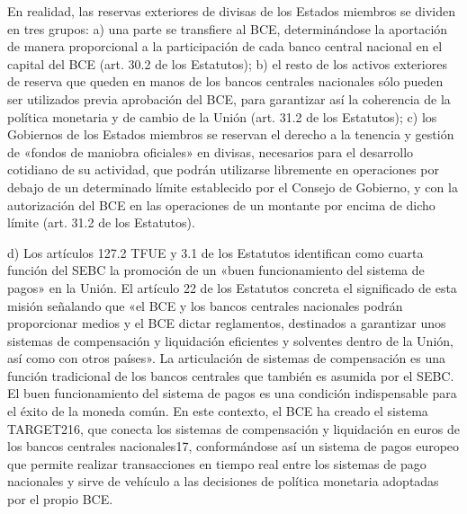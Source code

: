 \documentclass[10pt,a4paper]{article}
\begin{document}
En realidad, las reservas exteriores de divisas de los Estados miembros se dividen en tres grupos: a) una parte se transfiere al BCE, determinándose la aportación de manera proporcional a la participación de cada banco central nacional en el capital del BCE  (art. 30.2 de los Estatutos); b) el resto de los activos exteriores de reserva que queden en manos de los bancos centrales nacionales sólo pueden ser utilizados previa aprobación del BCE, para garantizar así la coherencia de la política monetaria y de cambio de la Unión (art. 31.2 de los Estatutos); c) los Gobiernos de los Estados miembros se reservan el derecho a la tenencia y gestión de «fondos de maniobra oficiales» en divisas, necesarios para el desarrollo cotidiano de su actividad, que podrán utilizarse libremente en operaciones por debajo de un determinado límite establecido por el Consejo de Gobierno, y con la autorización del BCE en las operaciones de un montante por encima de dicho límite (art. 31.2 de los Estatutos).

d) Los artículos 127.2 TFUE y 3.1 de los Estatutos identifican como cuarta función del SEBC la promoción de un «buen funcionamiento del sistema de pagos» en la Unión. El artículo 22 de los Estatutos concreta el significado de esta misión señalando que «el BCE y los bancos centrales nacionales podrán proporcionar medios y el BCE dictar reglamentos, destinados a garantizar unos sistemas de compensación y liquidación eficientes y solventes dentro de la Unión, así como con otros países». La articulación de sistemas de compensación es una función tradicional de los bancos centrales que también es asumida por el SEBC. El buen funcionamiento del sistema de pagos es una condición indispensable para el éxito de la moneda común. En este contexto, el BCE ha creado el sistema TARGET216, que conecta los sistemas de compensación y liquidación en euros de los bancos centrales nacionales17, conformándose así un sistema de pagos europeo que permite realizar transacciones en tiempo real entre los sistemas de pago nacionales y sirve de vehículo a las decisiones de política monetaria adoptadas por el propio BCE.
\end{document}
